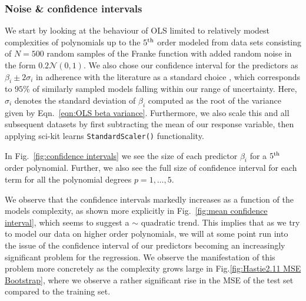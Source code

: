 \documentclass[reprint, english, nofootinbib]{revtex4-2}
\begin{document}
\subsubsection{Noise \& confidence intervals}

\noindent
We start by looking at the behaviour of OLS limited to relatively modest complexities of polynomials up to the $5^{\textup{th}}$ order modeled from data sets consisting of $N=500$ random samples of the Franke function with added random noise in the form $0.2\mathcal N(0, 1)$. We also chose our confidence interval for the predictors as $\beta_i\pm 2\sigma_i$ in adherence with the literature as a standard choice \cite{hastie}, which corresponds to $95\%$ of similarly sampled models falling within our range of uncertainty. Here, $\sigma_i$ denotes the standard deviation of $\beta_i$ computed as the root of the variance given by Eqn.~\ref{eqn:OLS beta variance}.
Furthermore, we also scale this and all subsequent datasets by first subtracting the mean of our response variable, then applying sci-kit learns \cite{scikit-learn} \lstinline{StandardScaler()} functionality.

In Fig.~\ref{fig:confidence intervals} we see the size of each predictor $\beta_i$ for a $5^{\textup{th}}$ order polynomial. Further, we also see the full size of confidence interval for each term for all the polynomial degrees $p = 1,\dots, 5$.

We observe that the confidence intervals markedly increases as a function of the models complexity, as shown more explicitly in Fig.~\ref{fig:mean confidence interval}, which seems to suggest a $\sim$ quadratic trend. This implies that as we try to model our data on higher order polynomials, we will at some point run into the issue of the confidence interval of our predictors becoming an increasingly significant problem for the regression.
We observe the manifestation of this problem more concretely as the complexity grows large in Fig.\ref{fig:Hastie2.11 MSE Bootstrap}, where we observe a rather significant rise in the MSE of the test set compared to the training set.
\end{document}
